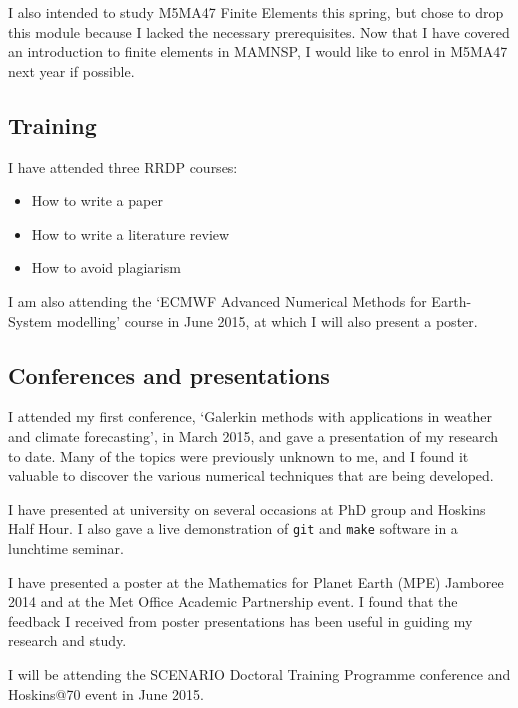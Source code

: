 \documentclass[a4paper]{article}
\begin{document}
I also intended to study M5MA47 Finite Elements this spring, but chose to drop this module because I lacked the necessary prerequisites.  Now that I have covered an introduction to finite elements in MAMNSP, I would like to enrol in M5MA47 next year if possible.

\subsection{Training}
I have attended three RRDP courses:
\begin{itemize}
	\item How to write a paper
	\item How to write a literature review
	\item How to avoid plagiarism
\end{itemize}
I am also attending the `ECMWF Advanced Numerical Methods for Earth-System modelling' course in June 2015, at which I will also present a poster.

\subsection{Conferences and presentations}
I attended my first conference, `Galerkin methods with applications in weather and climate forecasting', in March 2015, and gave a presentation of my research to date.  Many of the topics were previously unknown to me, and I found it valuable to discover the various numerical techniques that are being developed.

I have presented at university on several occasions at PhD group and Hoskins Half Hour.  I also gave a live demonstration of \texttt{git} and \texttt{make} software in a lunchtime seminar.

I have presented a poster at the Mathematics for Planet Earth (MPE) Jamboree 2014 and at the Met Office Academic Partnership event.  I found that the feedback I received from poster presentations has been useful in guiding my research and study.

I will be attending the SCENARIO Doctoral Training Programme conference and Hoskins@70 event in June 2015.
\end{document}
